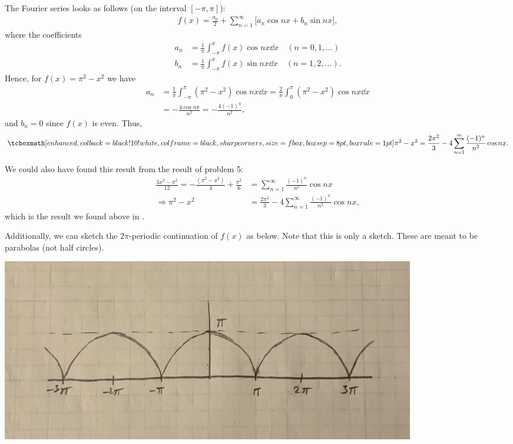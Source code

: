 
The Fourier series looks as follows (on the interval $[-\pi,\pi]$):
\begin{eqnarray}
    \label{eq:fourier-series}
    f(x) = \frac{a_0}{2} + \sum_{n=1}^{\infty} \big[ a_{n}\cos{n x} + b_{n}\sin{n x} \big]
,\end{eqnarray}
where the coefficients
\begin{align}
    \label{eq:coeffs}
    a_{n} &= \frac{1}{\pi} \int_{-\pi}^{\pi} f(x) \cos{nx} \dd{x} \quad (n=0,1,\ldots) \\
    b_{n} &= \frac{1}{\pi} \int_{-\pi}^{\pi} f(x) \sin{nx} \dd{x} \quad (n=1,2,\ldots)
.\end{align}
Hence, for $f(x) = \pi^2 - x^2$ we have 
\begin{align}
    \label{eq:an}
    a_{n} &= \frac{1}{\pi} \int_{-\pi}^{\pi} (\pi^2 - x^2)\cos{nx} \dd{x} = \frac{2}{\pi} \int_{0}^{\pi} (\pi^2 - x^2) \cos{nx} \dd{x} \\
          &= -\frac{4\cos{n\pi}}{n^2} = -\frac{4(-1)^{n}}{n^2}
,\end{align}
and $b_{n} = 0$ since $f(x)$ is even. 
Thus,
\begin{eqnarray}
    \label{eq:fourier-pix}
    \eqbox{
    \pi^2 - x^2 = \frac{2\pi^2}{3} -4\sum_{n=1}^{\infty} \frac{(-1)^{n}}{n^2}\cos{nx}
}
.\end{eqnarray}

We could also have found this result from the result of problem 5:
\begin{align}
    \label{eq:3-from-5}
    \frac{3x^2 - \pi^2}{12} = -\frac{(\pi^2 - x^2)}{4} +\frac{\pi^2}{6} &= \sum_{n=1}^{\infty} \frac{(-1)^{n}}{n^2}\cos{nx} \\
    \Rightarrow \pi^2 - x^2 &= \frac{2\pi^2}{3} - 4\sum_{n=1}^{\infty} \frac{(-1)^{n}}{n^2} \cos{nx}
,\end{align}
which is the result we found above in .

Additionally, we can sketch the $2\pi$-periodic continuation of $f(x)$ as below.
Note that this is only a sketch.
These are meant to be parabolas (not half circles).
\begin{center}
    \includegraphics[width=0.8\textwidth]{prob3.png}
\end{center}


